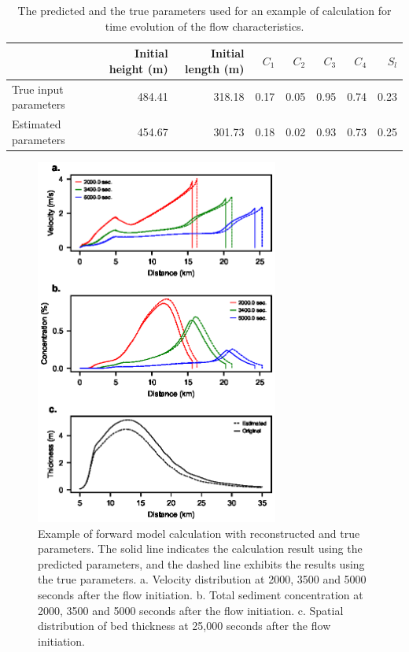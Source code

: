 \begin{table}[t]
  \caption{The predicted and the true parameters used for an example of calculation for time evolution of the flow characteristics.}
  \begin{tabular}{lrrrrrrr} \hline 
        {} &  Initial height (m) &  Initial length (m) &      $C_1$ &      $C_2$ &      $C_3$ &      $C_4$ &      $S_l$ \\
        \hline
        True input parameters &              484.41 &              318.18 &     0.17 &     0.05 &     0.95 &     0.74 &     0.23 \\
Estimated parameters  &              454.67 &              301.73 &     0.18 &     0.02 &     0.93 &     0.73 &     0.25 \\
    \hline
        \end{tabular}
  \label{table:example_time_evolution}
\end{table}


\begin{figure}[t]
  \includegraphics[width=8cm]{fig09.eps}
  \caption{Example of forward model calculation with reconstructed and true parameters. The solid line indicates the calculation result using the predicted parameters, and the dashed line exhibits the results using the true parameters. \textsf{a}. Velocity distribution at 2000, 3500 and 5000 seconds after the flow initiation. \textsf{b}. Total sediment concentration at 2000, 3500 and 5000 seconds after the flow initiation. \textsf{c}. Spatial distribution of bed thickness at 25,000 seconds after the flow initiation. }
  \label{fig:test_example_time_evolution}
\end{figure}


